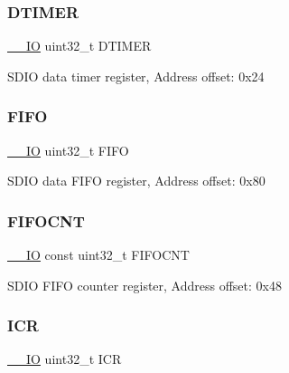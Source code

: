 \subsubsection{\texorpdfstring{D\+T\+I\+M\+ER}{DTIMER}}
{\footnotesize\ttfamily \mbox{\hyperlink{core__sc300_8h_aec43007d9998a0a0e01faede4133d6be}{\+\_\+\+\_\+\+IO}} uint32\+\_\+t D\+T\+I\+M\+ER}

S\+D\+IO data timer register, Address offset\+: 0x24 \mbox{\label{struct_s_d_i_o___type_def_a68bef1da5fd164cf0f884b4209670dc8}} 
\subsubsection{\texorpdfstring{F\+I\+FO}{FIFO}}
{\footnotesize\ttfamily \mbox{\hyperlink{core__sc300_8h_aec43007d9998a0a0e01faede4133d6be}{\+\_\+\+\_\+\+IO}} uint32\+\_\+t F\+I\+FO}

S\+D\+IO data F\+I\+FO register, Address offset\+: 0x80 \mbox{\label{struct_s_d_i_o___type_def_a003c4c00f70bd77298fc66a449822651}} 
\subsubsection{\texorpdfstring{F\+I\+F\+O\+C\+NT}{FIFOCNT}}
{\footnotesize\ttfamily \mbox{\hyperlink{core__sc300_8h_aec43007d9998a0a0e01faede4133d6be}{\+\_\+\+\_\+\+IO}} const uint32\+\_\+t F\+I\+F\+O\+C\+NT}

S\+D\+IO F\+I\+FO counter register, Address offset\+: 0x48 \mbox{\label{struct_s_d_i_o___type_def_a0a8c8230846fd8ff154b9fde8dfa0399}} 
\subsubsection{\texorpdfstring{I\+CR}{ICR}}
{\footnotesize\ttfamily \mbox{\hyperlink{core__sc300_8h_aec43007d9998a0a0e01faede4133d6be}{\+\_\+\+\_\+\+IO}} uint32\+\_\+t I\+CR}

